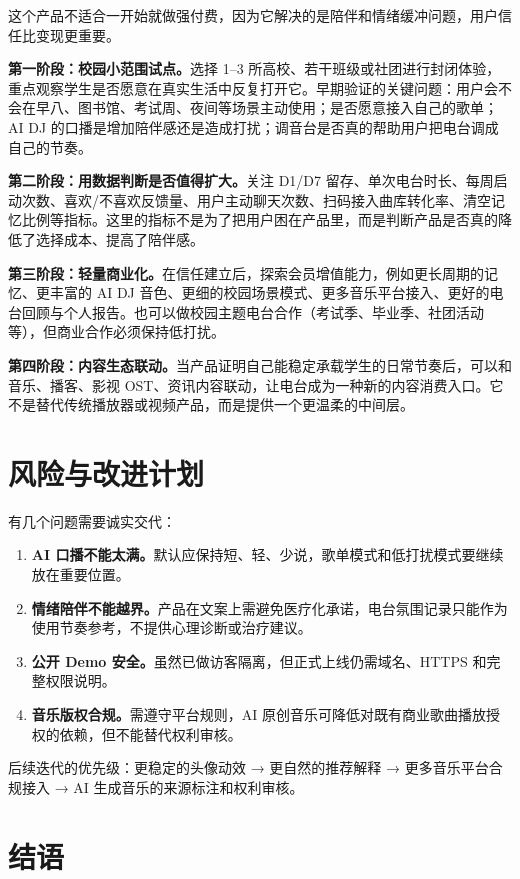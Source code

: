 \documentclass[UTF8,a4paper,11pt,fontset=windows]{ctexart}
\begin{document}
这个产品不适合一开始就做强付费，因为它解决的是陪伴和情绪缓冲问题，用户信任比变现更重要。

\textbf{第一阶段：校园小范围试点。}选择 1--3 所高校、若干班级或社团进行封闭体验，重点观察学生是否愿意在真实生活中反复打开它。早期验证的关键问题：用户会不会在早八、图书馆、考试周、夜间等场景主动使用；是否愿意接入自己的歌单；AI DJ 的口播是增加陪伴感还是造成打扰；调音台是否真的帮助用户把电台调成自己的节奏。

\textbf{第二阶段：用数据判断是否值得扩大。}关注 D1/D7 留存、单次电台时长、每周启动次数、喜欢/不喜欢反馈量、用户主动聊天次数、扫码接入曲库转化率、清空记忆比例等指标。这里的指标不是为了把用户困在产品里，而是判断产品是否真的降低了选择成本、提高了陪伴感。

\textbf{第三阶段：轻量商业化。}在信任建立后，探索会员增值能力，例如更长周期的记忆、更丰富的 AI DJ 音色、更细的校园场景模式、更多音乐平台接入、更好的电台回顾与个人报告。也可以做校园主题电台合作（考试季、毕业季、社团活动等），但商业合作必须保持低打扰。

\textbf{第四阶段：内容生态联动。}当产品证明自己能稳定承载学生的日常节奏后，可以和音乐、播客、影视 OST、资讯内容联动，让电台成为一种新的内容消费入口。它不是替代传统播放器或视频产品，而是提供一个更温柔的中间层。

\section{风险与改进计划}

有几个问题需要诚实交代：

\begin{enumerate}
  \item \textbf{AI 口播不能太满。}默认应保持短、轻、少说，歌单模式和低打扰模式要继续放在重要位置。
  \item \textbf{情绪陪伴不能越界。}产品在文案上需避免医疗化承诺，电台氛围记录只能作为使用节奏参考，不提供心理诊断或治疗建议。
  \item \textbf{公开 Demo 安全。}虽然已做访客隔离，但正式上线仍需域名、HTTPS 和完整权限说明。
  \item \textbf{音乐版权合规。}需遵守平台规则，AI 原创音乐可降低对既有商业歌曲播放授权的依赖，但不能替代权利审核。
\end{enumerate}

后续迭代的优先级：更稳定的头像动效 → 更自然的推荐解释 → 更多音乐平台合规接入 → AI 生成音乐的来源标注和权利审核。

\section{结语}
\end{document}
